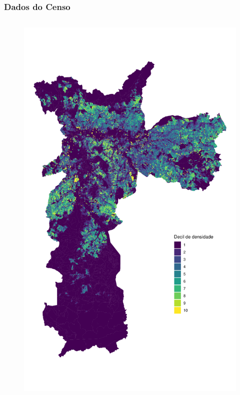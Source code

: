 \documentclass[%
    8pt, 
    aspectratio=169,
]{beamer}
\begin{document}
\begin{frame}
    \frametitle{Dados do Censo}
    \begin{columns}
        \begin{figure}
            \centering
            \includegraphics[height=.95\textheight]{imagens/mapa.pdf}
        \end{figure}


\end{columns}
\end{frame}
\end{document}
